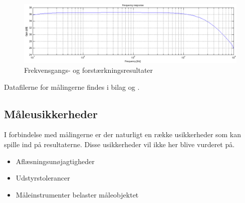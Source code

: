 \begin{figure}[h]
\centering
\includegraphics[width=\textwidth]{maalerapporter/forforstaerker/frekvensrespons-forforstaerker.png}
\caption{Frekvensgangs- og forstærkningsresultater}
\label{fig:fresultat-forforstaerker}
\end{figure}

Datafilerne for målingerne findes i bilag  og .

\subsection*{Måleusikkerheder}
I forbindelse med målingerne er der naturligt en række usikkerheder som kan spille ind på resultaterne. Disse usikkerheder vil ikke her blive vurderet på. 

\begin{itemize}
\item Aflæsningsunøjagtigheder
\item Udstyrstolerancer
\item Måleinstrumenter belaster måleobjektet
\end{itemize}

%